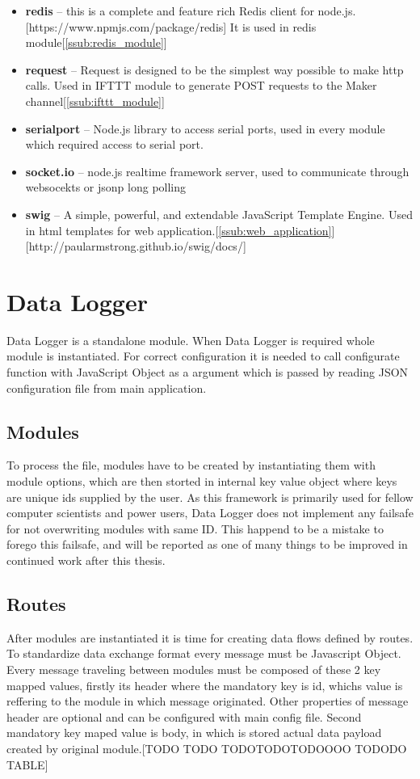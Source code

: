 \begin{itemize}
    \item \textbf{redis} -- this is a complete and feature rich Redis client for node.js.[https://www.npmjs.com/package/redis] It is used in redis module[\ref{ssub:redis_module}]
    \item \textbf{request} -- Request is designed to be the simplest way possible to make http calls. Used in IFTTT module to generate POST requests to the Maker channel[\ref{ssub:ifttt_module}]
    \item \textbf{serialport} -- Node.js library to access serial ports, used in every module which required access to serial port.
    \item \textbf{socket.io} -- node.js realtime framework server, used to communicate through websocekts or jsonp long polling
    \item \textbf{swig} -- A simple, powerful, and extendable JavaScript Template Engine. Used in html templates for web application.[\ref{ssub:web_application}][http://paularmstrong.github.io/swig/docs/]
\end{itemize}
\section{Data Logger} %
\label{sec:Data Logger}
Data Logger is a standalone module. When Data Logger is required whole module is instantiated. For correct configuration it is needed to call configurate function with JavaScript Object as a argument which is passed by reading JSON configuration file from main application.
\subsection{Modules} %
\label{sub:modules}
To process the file, modules have to be created by instantiating them with module options, which are then storted in internal key value object where keys are unique ids supplied by the user. As this framework is primarily used for fellow computer scientists and power users, Data Logger does not implement any failsafe for not overwriting modules with same ID. This happend to be a mistake to forego this failsafe, and will be reported as one of many things to be improved in continued work after this thesis.
\subsection{Routes} %
\label{sub:routes}
After modules are instantiated it is time for creating data flows defined by routes. To standardize data exchange format every message must be Javascript Object. Every message traveling between modules must be composed of these 2 key mapped values, firstly its header where the mandatory key is id, whichs value is reffering to the module in which message originated. Other properties of message header are optional and can be configured with main config file. Second mandatory key maped value is body, in which is stored actual data payload created by original module.[TODO TODO TODOTODOTODOOOO TODODO TABLE]

